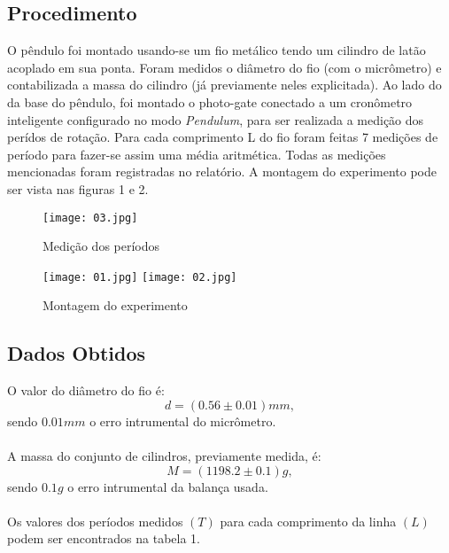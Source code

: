 \documentclass[12pt,a4paper]{article}
\begin{document}
\subsection{Procedimento}
O pêndulo foi montado usando-se um fio metálico tendo um cilindro de latão acoplado em sua ponta. Foram medidos o diâmetro do fio (com o micrômetro) e contabilizada a massa do cilindro (já previamente neles explicitada). Ao lado do da base do pêndulo, foi montado o photo-gate conectado a um cronômetro inteligente configurado no modo \emph{Pendulum}, para ser realizada a medição dos perídos de rotação. Para cada comprimento L do fio foram feitas 7 medições de período para fazer-se assim uma média aritmética. Todas as medições mencionadas foram registradas no relatório.  A montagem do experimento pode ser vista nas figuras 1 e 2.

\begin{figure}[!htbp]
	\texttt{[image: 03.jpg]}
	\caption{Medição dos períodos}
	\label{fig:cilindro}
\end{figure}

\begin{figure}[!htbp]
	\centering
	\texttt{[image: 01.jpg]}
	\texttt{[image: 02.jpg]}
	\caption{Montagem do experimento}
\end{figure}

\subsection{Dados Obtidos}
O valor do diâmetro do fio é:
$$ d = (0.56 \pm 0.01) mm, $$
sendo $0.01 mm$ o erro intrumental do micrômetro.\\\\
A massa do conjunto de cilindros, previamente medida, é:
$$ M = (1198.2 \pm 0.1) g,$$
sendo $0.1 g$ o erro intrumental da balança usada.\\\\
Os valores dos períodos medidos $(T)$ para cada comprimento da linha $(L)$ podem ser encontrados na tabela 1.
\end{document}
